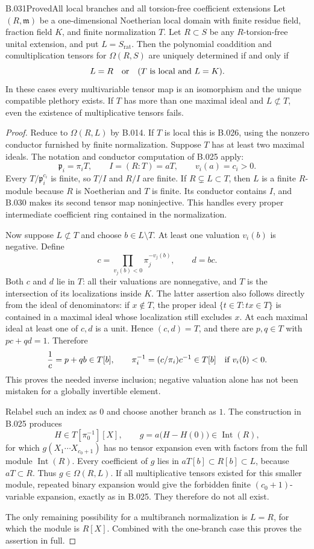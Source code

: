 \begin{saresult}{B.031}{Proved}{All local branches and all torsion-free coefficient extensions}
Let $(R,\mathfrak m)$ be a one-dimensional Noetherian local domain
with finite residue field, fraction field $K$, and finite
normalization $T$. Let $R\subset S$ be any $R$-torsion-free
unital extension, and put $L=S_{\mathrm{rat}}$.
Then the polynomial coaddition and comultiplication tensors for
$\Omega(R,S)$ are uniquely determined if and only if
\[
 L=R\quad\hbox{or}\quad (T\hbox{ is local and }L=K).
\]
In these cases every multivariable tensor map is an isomorphism
and the unique compatible plethory exists. If $T$ has more than
one maximal ideal and $L\not\subset T$, even the existence of
multiplicative tensors fails.
\end{saresult}
\begin{proof}
Reduce to $\Omega(R,L)$ by B.014. If $T$ is local this is B.026,
using the nonzero conductor furnished by finite normalization.
Suppose $T$ has at least two maximal ideals. The notation and
conductor computation of B.025 apply:
\[
 \mathfrak p_i=\pi_iT,\qquad
 I=(R:T)=aT,\qquad v_i(a)=c_i>0.
\]
Every $T/\mathfrak p_i^{c_i}$ is finite, so $T/I$ and $R/I$
are finite. If $R\subsetneq L\subset T$, then $L$ is a finite
$R$-module because $R$ is Noetherian and $T$ is finite.
Its conductor contains $I$, and B.030 makes its second tensor
map noninjective. This handles every proper intermediate
coefficient ring contained in the normalization.

Now suppose $L\not\subset T$ and choose $b\in L\setminus T$.
At least one valuation $v_i(b)$ is negative. Define
\[
 c=\prod_{v_j(b)<0}\pi_j^{-v_j(b)},\qquad d=bc.
\]
Both $c$ and $d$ lie in $T$: all their valuations are nonnegative,
and $T$ is the intersection of its localizations inside $K$.
The latter assertion also follows directly from the ideal of
denominators: if $x\notin T$, the proper ideal
$\{t\in T:tx\in T\}$ is contained in a maximal ideal whose
localization still excludes $x$. At each maximal ideal at least
one of $c,d$ is a unit. Hence $(c,d)=T$, and there are $p,q\in T$
with $pc+qd=1$. Therefore
\[
 \frac1c=p+qb\in T[b],\qquad
 \pi_i^{-1}=(c/\pi_i)c^{-1}\in T[b]
       \quad\hbox{if }v_i(b)<0.
\]
This proves the needed inverse inclusion; negative valuation
alone has not been mistaken for a globally invertible element.

Relabel such an index as $0$ and choose another branch as $1$.
The construction in B.025 produces
\[
 H\in T[\pi_0^{-1}][X],\qquad
 g=a\bigl(H-H(0)\bigr)\in\operatorname{Int}(R),
\]
for which $g(X_1\cdots X_{c_0+1})$ has no tensor expansion even
with factors from the full module $\operatorname{Int}(R)$.
Every coefficient of $g$ lies in $aT[b]\subset R[b]\subset L$,
because $aT\subset R$. Thus $g\in\Omega(R,L)$.
If all multiplicative tensors existed for this smaller module,
repeated binary expansion would give the forbidden finite
$(c_0+1)$-variable expansion, exactly as in B.025.
They therefore do not all exist.

The only remaining possibility for a multibranch normalization
is $L=R$, for which the module is $R[X]$. Combined with the
one-branch case this proves the assertion in full.
\end{proof}


